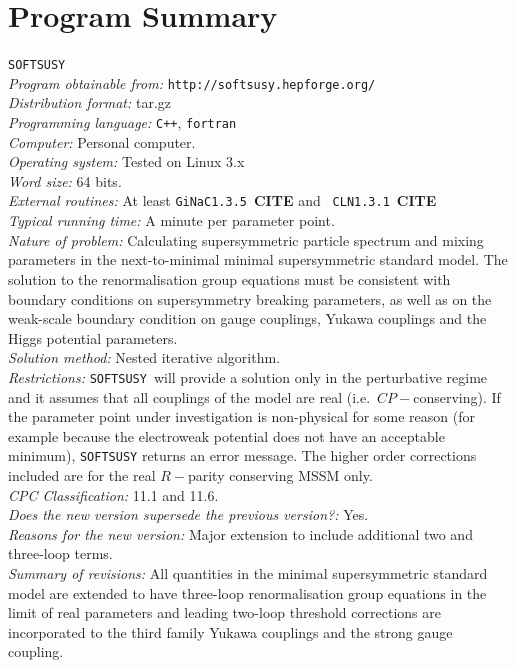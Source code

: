 \documentclass[final,3p,times,pdflatex]{elsarticle}
\def\SOFTSUSY{{\tt SOFTSUSY}}
\begin{document}
\section{Program Summary}
 \SOFTSUSY{}\\
{\em Program obtainable   from:} {\tt http://softsusy.hepforge.org/}\\
{\em Distribution format:}\/ tar.gz\\
{\em Programming language:} {\tt C++}, {\tt fortran}\\
{\em Computer:}\/ Personal computer.\\
{\em Operating system:}\/ Tested on Linux 3.x\\
{\em Word size:}\/ 64 bits.\\
{\em External routines:}\/ At least {\tt GiNaC1.3.5}~{\bf CITE} and {\tt
  CLN1.3.1}~{\bf CITE}\\
{\em Typical running time:}\/ A minute per parameter point.\\
{\em Nature of problem:}\/ Calculating supersymmetric particle spectrum and
mixing parameters in the next-to-minimal minimal supersymmetric standard
model. The solution to the renormalisation group equations must be consistent
with boundary conditions on supersymmetry breaking parameters, as
well as on the weak-scale boundary condition on gauge 
couplings, Yukawa couplings and the Higgs potential parameters.\\
{\em Solution method:}\/ Nested iterative algorithm. \\
{\em Restrictions:} \SOFTSUSY~will provide a solution only in the
perturbative regime and it
assumes that all couplings of the model are real
(i.e.\ $CP-$conserving). If the parameter point under investigation is
non-physical for some reason (for example because the electroweak potential
does not have an acceptable minimum), \SOFTSUSY{} returns an error message.
The higher order corrections included are for the real $R-$parity conserving
MSSM only.\\
{\em CPC Classification:} 11.1 and 11.6.\\
{\em Does the new version supersede the previous version?:} Yes.\\
{\em Reasons for the new version:} Major extension to include additional two
and three-loop terms.\\
{\em Summary of revisions:} 
All quantities in the minimal supersymmetric standard model are extended to
have three-loop renormalisation group equations in the limit of real
parameters and leading two-loop threshold
corrections are incorporated to the third family Yukawa couplings and the
strong gauge coupling. 
\newpage
\end{document}
